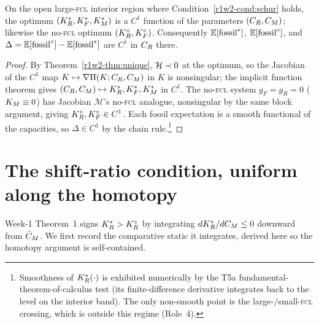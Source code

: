 \begin{corollary}\label{r1w2-cor:c1}
On the open large-\textsc{fcl} interior region where Condition~\ref{r1w2-cond:schur}
holds, the optimum $(K_R^{*},K_F^{*},K_M^{*})$ is a $C^{1}$ function of the parameters
$(C_R,C_M)$; likewise the no-\textsc{fcl} optimum $(K_R^{\circ},K_F^{\circ})$. Consequently
$\mathbb{E}[\text{fossil}^{*}]$, $\mathbb{E}[\text{fossil}^{\circ}]$, and
$\Delta=\mathbb{E}[\text{fossil}^{\circ}]-\mathbb{E}[\text{fossil}^{*}]$ are $C^{1}$ in $C_R$ there.
\end{corollary}
\begin{proof}
By Theorem~\ref{r1w2-thm:unique}, $\mathcal H\prec0$ at the optimum, so the Jacobian of the
$C^{1}$ map $K\mapsto\nabla\Pi(K;C_R,C_M)$ in $K$ is nonsingular; the implicit
function theorem gives $(C_R,C_M)\mapsto K_R^{*},K_F^{*},K_M^{*}$ in $C^{1}$. The
no-\textsc{fcl} system $g_F=g_R=0$ ($K_M\equiv0$) has Jacobian $\mathcal M$'s
no-\textsc{fcl} analogue, nonsingular by the same block argument, giving
$K_R^{\circ},K_F^{\circ}\in C^{1}$. Each fossil expectation is a smooth functional of the
capacities, so $\Delta\in C^{1}$ by the chain rule.\footnote{Smoothness of
$K_R^{*}(\cdot)$ is exhibited numerically by the T5a fundamental-theorem-of-calculus
test (its finite-difference derivative integrates back to the level on the interior
band). The only non-smooth point is the large-/small-\textsc{fcl} crossing, which is
outside this regime (Role~4).}
\end{proof}

\section{The shift-ratio condition, uniform along the homotopy}\label{r1w2-sec:homotopy}

Week-1 Theorem~1 signs $K_R^{*}>K_R^{\circ}$ by integrating $dK_R^{*}/dC_M\le0$ downward from
$\bar C_M$. We first record the comparative static it integrates, derived here so the
homotopy argument is self-contained.

